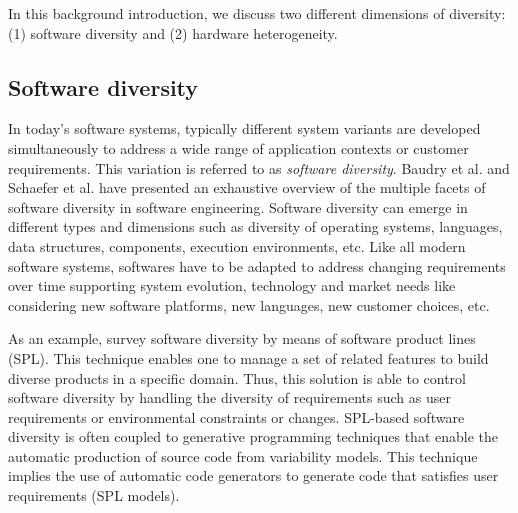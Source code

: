 In this background introduction, we discuss two different dimensions of diversity: (1) software diversity and (2) hardware heterogeneity.

 
 
\subsection{Software diversity}
In today’s software systems, typically different system variants are developed simultaneously to address a wide range of application contexts or customer requirements\cite{schaefer2012software}. 
This variation is referred to as \textit{software diversity}. 
Baudry et al.\cite{baudry2015multiple} and Schaefer et al.\cite{schaefer2012software} have presented an exhaustive overview of the multiple facets of software diversity in software engineering. 
Software diversity can emerge in different types and dimensions such as diversity of operating systems, languages, data structures, components, execution environments, etc. 
Like all modern software systems, softwares have to be adapted to address changing requirements over time supporting system evolution, technology and market needs like considering new software platforms, new languages, new customer choices, etc.


As an example, \cite{schaefer2012software} survey software diversity by means of software product lines (SPL). This technique enables one to manage a set of related features to build diverse products in a specific domain. Thus, this solution is able to control software diversity by handling the diversity of requirements such as user requirements or environmental constraints or changes. SPL-based software diversity is often coupled to generative programming techniques\cite{Czarnecki:2000:GPM:345203} that enable the automatic production of source code from variability models. This technique implies the use of automatic code generators to generate code that satisfies user requirements (SPL models).

